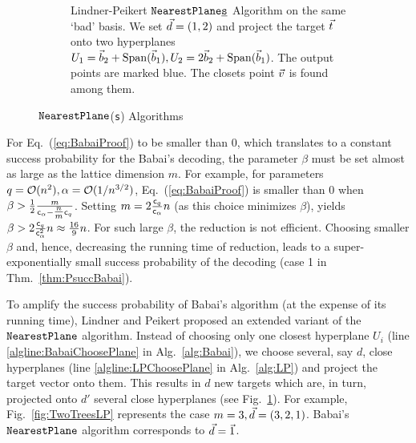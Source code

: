 \begin{figure}
\begin{subfigure}[b]{0.32\textwidth}
	\caption{\scriptsize Lindner-Peikert $\texttt{NearestPlane\underline{s}}$ Algorithm on the same `bad' basis. We set $\vec d = (1, 2)$ and project the target $\tvec$ onto two hyperplanes $U_1 = \vec b_2+\operatorname{Span}(\vec b_1), U_2 = 2\vec b_2+\operatorname{Span}(\vec b_1)$. The output points are marked blue. The closets point $\vvec$ is found among them.}
	\label{fig:NP3}
    \end{subfigure}%
    \caption{$\texttt{NearestPlane}$(\texttt{s}) Algorithms}
    \label{fig:NPAlgs}
\end{figure}

For Eq.~(\ref{eq:BabaiProof}) to be smaller than 0, which translates to a constant success probability for the Babai's \LWE decoding, the \BKZ parameter $\beta$ must be set almost as large as the lattice dimension $m$. For example, for parameters $q=\mathcal{O}(n^2), \alpha=\mathcal{O}(1/n^{3/2})$, Eq.~(\ref{eq:BabaiProof}) is smaller than 0 when $\beta > \frac{1}{2} \frac{m}{\mathsf{c}_{\alpha} - \tfrac{n}{m} \mathsf{c}_q}$. Setting $m = 2 \frac{\mathsf{c}_q}{\mathsf{c}_{\alpha}} n$ (as this choice minimizes $\beta$), yields $\beta > 2 \frac{\mathsf{c}_q}{\mathsf{c}_{\alpha}^2}n \approx \frac{16}{9}n$. For such large $\beta$, the \BKZ reduction is not efficient. Choosing smaller $\beta$ and, hence, decreasing the running time of \BKZ reduction, leads to a super-exponentially small success probability of the decoding (case 1 in Thm.~\ref{thm:PsuccBabai}).

To amplify the success probability of Babai's algorithm (at the expense of its running time), Lindner and Peikert \cite{RSA:LinPei11} proposed an extended variant of the $\texttt{NearestPlane}$ algorithm. Instead of choosing only one closest hyperplane $U_i$ (line \ref{algline:BabaiChoosePlane} in Alg.~\ref{alg:Babai}), we choose several, say $d$, close hyperplanes (line \ref{algline:LPChoosePlane} in Alg.~\ref{alg:LP}) and project the target vector onto them. This results in $d$ new targets which are, in turn, projected onto $d'$ several close hyperplanes (see Fig.~\ref{fig:NP3}). For example, Fig.~\ref{fig:TwoTreesLP} represents the case $m=3, \vec d = (3, 2, 1)$. Babai's $\texttt{NearestPlane}$ algorithm corresponds to $\vec d = \vec{1}$.


